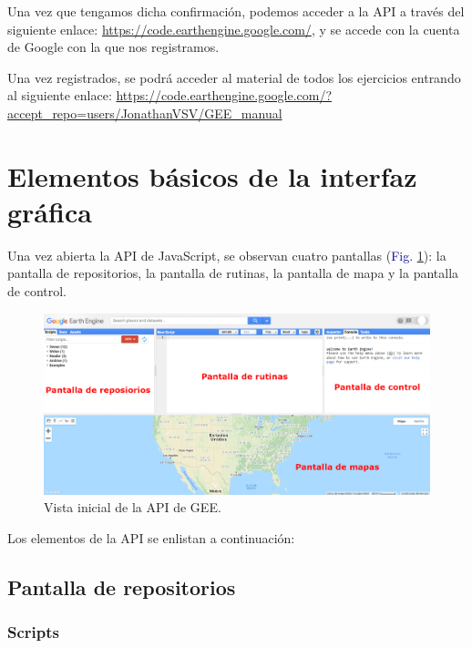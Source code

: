 \documentclass[
  12pt,
  letterpaper,
  twoside]{book}
\begin{document}
Una vez que tengamos dicha confirmación, podemos acceder a la API a través del siguiente enlace: \url{https://code.earthengine.google.com/}, y se accede con la cuenta de Google con la que nos registramos.

Una vez registrados, se podrá acceder al material de todos los ejercicios entrando al siguiente enlace: \url{https://code.earthengine.google.com/?accept_repo=users/JonathanVSV/GEE_manual}

\hypertarget{elementos-buxe1sicos-de-la-interfaz-gruxe1fica}{%
\section{Elementos básicos de la interfaz gráfica}\label{elementos-buxe1sicos-de-la-interfaz-gruxe1fica}}

Una vez abierta la API de JavaScript, se observan cuatro pantallas (\textcolor{darkblue}{Fig.} \ref{fig:f24}): la pantalla de repositorios, la pantalla de rutinas, la pantalla de mapa y la pantalla de control.

\begin{figure}[H]

{\centering \includegraphics[width=0.95\linewidth]{Img/GEE_inicio_API2} 

}

\caption{Vista inicial de la API de GEE.}\label{fig:f24}
\end{figure}

Los elementos de la API se enlistan a continuación:

\hypertarget{pantalla-de-repositorios}{%
\subsection*{Pantalla de repositorios}\label{pantalla-de-repositorios}}

\hypertarget{scripts}{%
\subsubsection*{Scripts}\label{scripts}}
\end{document}
